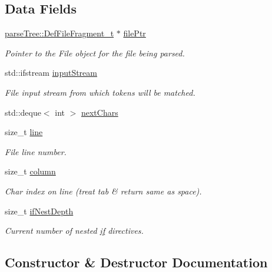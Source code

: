 \subsection*{Data Fields}
\begin{DoxyCompactItemize}
\item 
\hyperlink{structparse_tree_1_1_def_file_fragment__t}{parse\+Tree\+::\+Def\+File\+Fragment\+\_\+t} $\ast$ \hyperlink{struct_lexer__t_1_1_lexer_context__t_a7a7490749571aad6a55775e2f3e11b64}{file\+Ptr}
\begin{DoxyCompactList}\small\item\em Pointer to the File object for the file being parsed. \end{DoxyCompactList}\item 
std\+::ifstream \hyperlink{struct_lexer__t_1_1_lexer_context__t_a767eb84f0dd562f663f299ac8e8f05e2}{input\+Stream}
\begin{DoxyCompactList}\small\item\em File input stream from which tokens will be matched. \end{DoxyCompactList}\item 
std\+::deque$<$ int $>$ \hyperlink{struct_lexer__t_1_1_lexer_context__t_af1d6222b4de2bc9f85c35a4aadd84118}{next\+Chars}
\item 
size\+\_\+t \hyperlink{struct_lexer__t_1_1_lexer_context__t_a4543fbb02e7a61383a9102f4703a522a}{line}
\begin{DoxyCompactList}\small\item\em File line number. \end{DoxyCompactList}\item 
size\+\_\+t \hyperlink{struct_lexer__t_1_1_lexer_context__t_a8f01457f48a62b8614ff75c56c3f475f}{column}
\begin{DoxyCompactList}\small\item\em Char index on line (treat tab \& return same as space). \end{DoxyCompactList}\item 
size\+\_\+t \hyperlink{struct_lexer__t_1_1_lexer_context__t_a0854c5341f96ad63b3462814671eabd6}{if\+Nest\+Depth}
\begin{DoxyCompactList}\small\item\em Current number of nested \hyperlink{wifi_web_ap_8c_a2bf420bda7cb80e4552dcff350cddbef}{if} directives. \end{DoxyCompactList}\end{DoxyCompactItemize}


\subsection{Constructor \& Destructor Documentation}
